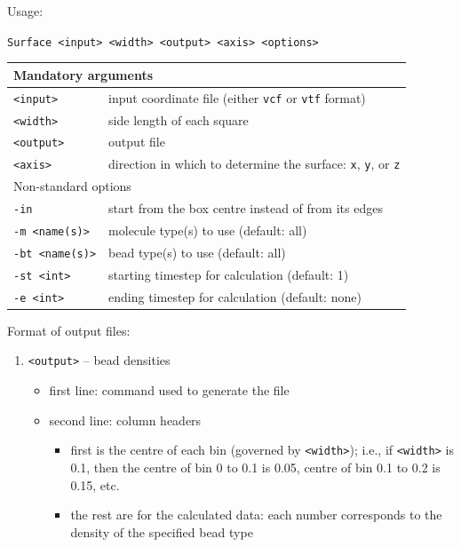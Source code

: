 Usage:

\vspace{1em}
\noindent
\texttt{Surface <input> <width> <output> <axis> <options>}

\noindent
\begin{longtable}{p{}p{}}
  \toprule
  \multicolumn{2}{l}{Mandatory arguments} \\
  \midrule
  \texttt{<input>} & input coordinate file (either \texttt{vcf} or
    \texttt{vtf} format) \\
  \texttt{<width>} & side length of each square \\
  \texttt{<output>} & output file \\
  \texttt{<axis>} & direction in which to determine the surface: \texttt{x},
    \texttt{y}, or \texttt{z} \\
  \toprule
  \multicolumn{2}{l}{Non-standard options} \\
  \midrule
  \texttt{-in} & start from the box centre instead of from its edges \\
  \texttt{-m <name(s)>} & molecule type(s) to use (default: all) \\
  \texttt{-bt <name(s)>} & bead type(s) to use (default: all) \\
  \texttt{-st <int>} & starting timestep for calculation (default: 1) \\
  \texttt{-e <int>} & ending timestep for calculation (default: none) \\
  \bottomrule
\end{longtable}

\noindent
Format of output files:
\begin{enumerate}[nosep,leftmargin=20pt]
  \item \texttt{<output>} -- bead densities
    \begin{itemize}[nosep,leftmargin=5pt]
      \item first line: command used to generate the file
      \item second line: column headers
        \begin{itemize}[nosep,leftmargin=5pt]
          \item first is the centre of each bin (governed by
            \texttt{<width>}); i.e., if \texttt{<width>} is 0.1,
            then the centre of bin 0 to 0.1 is 0.05, centre of bin 0.1 to
            0.2 is 0.15, etc.
          \item the rest are for the calculated data: each number
            corresponds to the density of the specified bead type
        \end{itemize}
    \end{itemize}
\end{enumerate}

